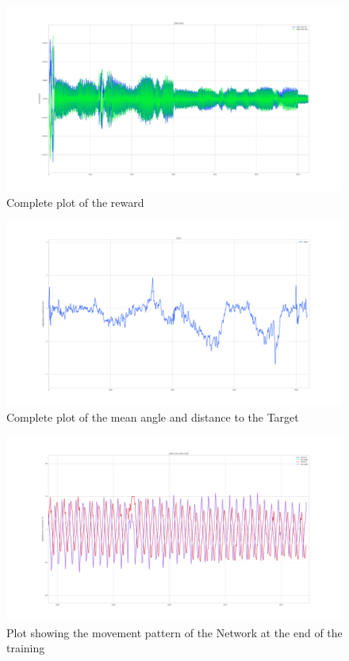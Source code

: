 \begin{figure}[htpb]
  \centering
  \includegraphics[width=\textwidth]{figures/plots/dopeBase1}
  \caption{ Complete plot of the reward }
  \label{fig:dopeBase1}
\end{figure}
\begin{figure}[htpb]
  \centering
  \includegraphics[width=\textwidth]{figures/plots/angleBase1}
  \caption{ Complete plot of the mean angle and distance to the Target }
  \label{fig:angleBase1}
\end{figure}
\begin{figure}[htpb]
  \centering
  \includegraphics[width=\textwidth]{figures/plots/moveEndBase1}
  \caption{ Plot showing the movement pattern of the Network at the end of the training }
  \label{fig:moveEndBase1}
\end{figure}
